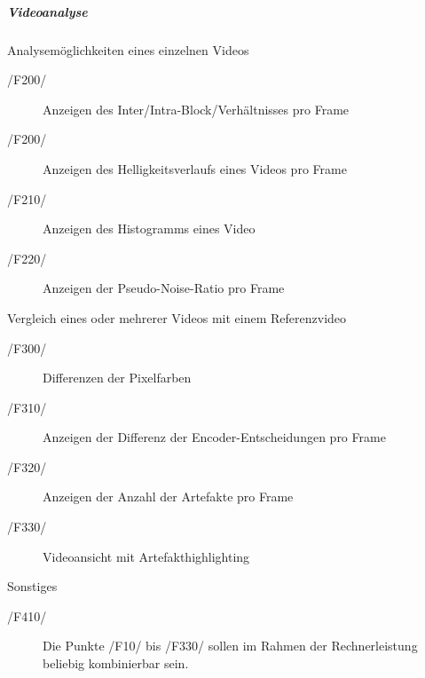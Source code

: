 \subparagraph{Videoanalyse}
\begin{description}
        \item Analysemöglichkeiten eines einzelnen Videos  
                \begin{description}
                        \item[/F200/]Anzeigen des Inter/Intra-Block/Verhältnisses pro Frame
                        \item[/F200/]Anzeigen des Helligkeitsverlaufs eines Videos pro Frame
                        \item[/F210/]Anzeigen des Histogramms eines Video
                        \item[/F220/]Anzeigen der Pseudo-Noise-Ratio pro Frame
                   \end{description}
        \item Vergleich eines oder mehrerer Videos mit einem Referenzvideo
                \begin{description}
                        \item[/F300/]Differenzen der Pixelfarben %
                        \item[/F310/]Anzeigen der Differenz der Encoder-Entscheidungen pro Frame
                        \item[/F320/]Anzeigen der Anzahl der Artefakte pro Frame
                        \item[/F330/]Videoansicht mit Artefakthighlighting
                \end{description}  
        \item Sonstiges
                \begin{description}
                        \item[/F410/]Die Punkte /F10/ bis /F330/ sollen im Rahmen der Rechnerleistung beliebig kombinierbar sein.
                \end{description}
\end{description}
 

